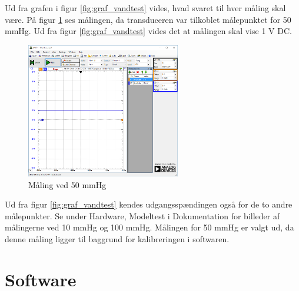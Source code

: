 Ud fra grafen i figur \ref{fig:graf_vandtest} vides, hvad svaret til hver måling skal være. På figur \ref{fig:vandtest_måling50} ses målingen, da transduceren var tilkoblet målepunktet for 50 mmHg. Ud fra figur \ref{fig:graf_vandtest} vides det at målingen skal vise 1 V DC.  
\begin{figure}[H]
	\centering	\includegraphics[width=0.6\textwidth]{Figurer/50mmhg}
	\caption{Måling ved 50 mmHg}
	\label{fig:vandtest_måling50}
\end{figure}
Ud fra figur \ref{fig:graf_vandtest} kendes udgangsspændingen også for de to andre målepunkter. Se under Hardware, Modeltest i Dokumentation for billeder af målingerne ved 10 mmHg og 100 mmHg. Målingen for 50 mmHg er valgt ud, da denne måling ligger til baggrund for kalibreringen i softwaren. 

\section{Software}
